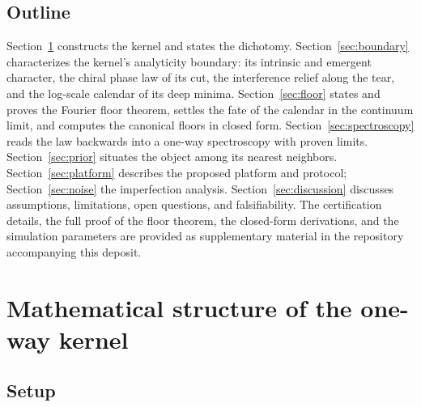 \documentclass[11pt,a4paper]{article}
\begin{document}
\subsection{Outline}

Section~\ref{sec:structure} constructs the kernel and states the dichotomy.
Section~\ref{sec:boundary} characterizes the kernel's analyticity
boundary: its intrinsic and emergent character, the chiral phase law of
its cut, the interference relief along the tear, and the log-scale
calendar of its deep minima. Section~\ref{sec:floor} states and proves
the Fourier floor theorem, settles the fate of the calendar in the
continuum limit, and computes the canonical floors in closed form.
Section~\ref{sec:spectroscopy} reads the law backwards into a one-way
spectroscopy with proven limits.
Section~\ref{sec:prior} situates the object among its nearest neighbors.
Section~\ref{sec:platform} describes the proposed platform and protocol;
Section~\ref{sec:noise} the imperfection analysis. Section~\ref{sec:discussion}
discusses assumptions, limitations, open questions, and falsifiability. The
certification details, the full proof of the floor theorem, the closed-form derivations, and the simulation
parameters are provided as supplementary material in the repository
accompanying this deposit.

\section{Mathematical structure of the one-way kernel}
\label{sec:structure}

\subsection{Setup}
\end{document}

